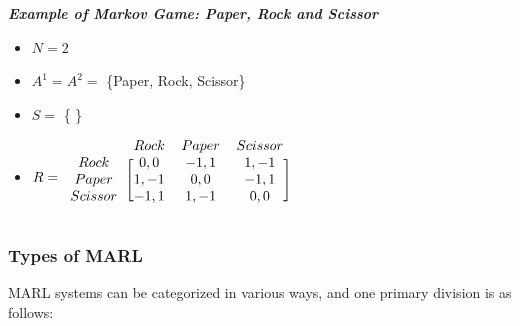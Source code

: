 \documentclass{scrartcl}
\begin{document}
\begin{boxK}
\textbf{\textit{Example of Markov Game: Paper, Rock and Scissor}}

  \begin{itemize}
    \item $N = 2$
    \item $A^1 = A^2 = $ \{Paper, Rock, Scissor\}
    \item $S = $ \{ \}
    \item $R = \begin{blockarray}{cccc}
      & Rock & Paper & Scissor \\
    \begin{block}{c[ccc]}
      Rock    & 0, 0  & -1, 1 & 1, -1 \\
      Paper   & 1, -1 & 0, 0  & -1, 1 \\
      Scissor & -1, 1 & 1, -1 & 0, 0 \\
    \end{block}
  \end{blockarray}$
  \end{itemize}
\end{boxK}

\subsubsection{Types of MARL}
MARL systems can be categorized in various ways, and one primary division is as follows:

%     
\end{document}
